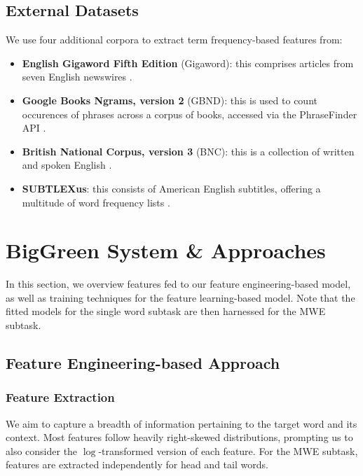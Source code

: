 \documentclass[11pt,a4paper]{article}
\begin{document}
\subsection{External Datasets}

We use four additional corpora to extract term frequency-based features from:

\begin{itemize}
  \item \noindent \textbf{English Gigaword Fifth Edition} (Gigaword): this comprises articles from seven English newswires \citep{parker2011english}.
  \item \noindent \textbf{Google Books Ngrams, version 2} (GBND): this is used to count occurences of phrases across a corpus of books, accessed via the PhraseFinder API \citep{phrasefinder}.
  \item \noindent \textbf{British National Corpus, version 3} (BNC): this is a collection of written and spoken English \citep{bnc2007british}.
  \item \noindent \textbf{SUBTLEXus}: this consists of American English subtitles, offering a multitude of word frequency lists \citep{brysbaert2009moving}.
\end{itemize}

\section{BigGreen System \& Approaches}

In this section, we overview features fed to our feature engineering-based model, as well as training techniques for the feature learning-based model. Note that the fitted models for the single word subtask are then harnessed for the MWE subtask.

\subsection{Feature Engineering-based Approach}

\subsubsection{Feature Extraction}

We aim to capture a breadth of information pertaining to the target word and its context. Most features follow heavily right-skewed distributions, prompting us to also consider the $\log$-transformed version of each feature. For the MWE subtask, features are extracted independently for head and tail words. 
\end{document}
